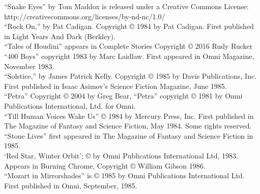 “Snake Eyes” by Tom Maddox is released under a Creative Commons License: http://creativecommons.org/licenses/by-nd-nc/1.0/ \\
“Rock On,” by Pat Cadigan. Copyright © 1984 by Pat Cadigan. First published in Light Years And Dark (Berkley). \\
“Tales of Houdini” appears in Complete Stories Copyright © 2016 Rudy Rucker “400 Boys” copyright 1983 by Marc Laidlaw. First appeared in Omni Magazine, November 1983. \\
“Solstice,” by James Patrick Kelly. Copyright © 1985 by Davis Publications, Inc. First published in Isaac Asimov’s Science Fiction Magazine, June 1985. \\
“Petra” Copyright © 2004 by Greg Bear, “Petra” copyright © 1981 by Omni Publications International, Ltd. for Omni. \\
“Till Human Voices Wake Us” © 1984 by Mercury Press, Inc. First published in The Magazine of Fantasy and Science Fiction, May 1984. Some rights reserved. \\
“Stone Lives” first appeared in The Magazine of Fantasy and Science Fiction in 1985. \\
‘Red Star, Winter Orbit’; © by Omni Publications International Ltd, 1983. Appears in Burning Chrome, Copyright © William Gibson 1986. \\
“Mozart in Mirrorshades” is © 1985 by Omni Publications International Ltd. First published in Omni, September, 1985.